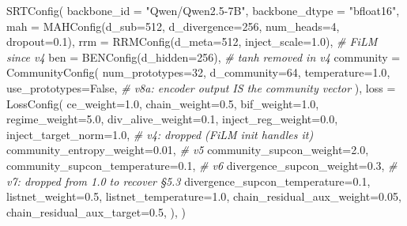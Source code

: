 \documentclass[
  11pt]{article}
\newenvironment{Shaded}{}{}
\newcommand{\CommentTok}[1]{\textcolor[rgb]{0.38,0.63,0.69}{\textit{#1}}}
\newcommand{\DecValTok}[1]{\textcolor[rgb]{0.25,0.63,0.44}{#1}}
\newcommand{\FloatTok}[1]{\textcolor[rgb]{0.25,0.63,0.44}{#1}}
\newcommand{\NormalTok}[1]{#1}
\newcommand{\OperatorTok}[1]{\textcolor[rgb]{0.40,0.40,0.40}{#1}}
\newcommand{\StringTok}[1]{\textcolor[rgb]{0.25,0.44,0.63}{#1}}
\newcommand{\VariableTok}[1]{\textcolor[rgb]{0.10,0.09,0.49}{#1}}
\begin{document}
\begin{Shaded}
\begin{Highlighting}[]
\NormalTok{SRTConfig(}
\NormalTok{    backbone\_id    }\OperatorTok{=} \StringTok{"Qwen/Qwen2.5{-}7B"}\NormalTok{,}
\NormalTok{    backbone\_dtype }\OperatorTok{=} \StringTok{"bfloat16"}\NormalTok{,}
\NormalTok{    mah }\OperatorTok{=}\NormalTok{ MAHConfig(d\_sub}\OperatorTok{=}\DecValTok{512}\NormalTok{, d\_divergence}\OperatorTok{=}\DecValTok{256}\NormalTok{, num\_heads}\OperatorTok{=}\DecValTok{4}\NormalTok{, dropout}\OperatorTok{=}\FloatTok{0.1}\NormalTok{),}
\NormalTok{    rrm }\OperatorTok{=}\NormalTok{ RRMConfig(d\_meta}\OperatorTok{=}\DecValTok{512}\NormalTok{, inject\_scale}\OperatorTok{=}\FloatTok{1.0}\NormalTok{),  }\CommentTok{\# FiLM since v4}
\NormalTok{    ben }\OperatorTok{=}\NormalTok{ BENConfig(d\_hidden}\OperatorTok{=}\DecValTok{256}\NormalTok{),                  }\CommentTok{\# tanh removed in v4}
\NormalTok{    community }\OperatorTok{=}\NormalTok{ CommunityConfig(}
\NormalTok{        num\_prototypes}\OperatorTok{=}\DecValTok{32}\NormalTok{, d\_community}\OperatorTok{=}\DecValTok{64}\NormalTok{, temperature}\OperatorTok{=}\FloatTok{1.0}\NormalTok{,}
\NormalTok{        use\_prototypes}\OperatorTok{=}\VariableTok{False}\NormalTok{,                       }\CommentTok{\# v8a: encoder output IS the community vector}
\NormalTok{    ),}
\NormalTok{    loss }\OperatorTok{=}\NormalTok{ LossConfig(}
\NormalTok{        ce\_weight}\OperatorTok{=}\FloatTok{1.0}\NormalTok{, chain\_weight}\OperatorTok{=}\FloatTok{0.5}\NormalTok{, bif\_weight}\OperatorTok{=}\FloatTok{1.0}\NormalTok{,}
\NormalTok{        regime\_weight}\OperatorTok{=}\FloatTok{5.0}\NormalTok{, div\_alive\_weight}\OperatorTok{=}\FloatTok{0.1}\NormalTok{,}
\NormalTok{        inject\_reg\_weight}\OperatorTok{=}\FloatTok{0.0}\NormalTok{, inject\_target\_norm}\OperatorTok{=}\FloatTok{1.0}\NormalTok{,    }\CommentTok{\# v4: dropped (FiLM init handles it)}
\NormalTok{        community\_entropy\_weight}\OperatorTok{=}\FloatTok{0.01}\NormalTok{,}
        \CommentTok{\# v5}
\NormalTok{        community\_supcon\_weight}\OperatorTok{=}\FloatTok{2.0}\NormalTok{,}
\NormalTok{        community\_supcon\_temperature}\OperatorTok{=}\FloatTok{0.1}\NormalTok{,}
        \CommentTok{\# v6}
\NormalTok{        divergence\_supcon\_weight}\OperatorTok{=}\FloatTok{0.3}\NormalTok{,                     }\CommentTok{\# v7: dropped from 1.0 to recover §5.3}
\NormalTok{        divergence\_supcon\_temperature}\OperatorTok{=}\FloatTok{0.1}\NormalTok{,}
\NormalTok{        listnet\_weight}\OperatorTok{=}\FloatTok{0.5}\NormalTok{,}
\NormalTok{        listnet\_temperature}\OperatorTok{=}\FloatTok{1.0}\NormalTok{,}
\NormalTok{        chain\_residual\_aux\_weight}\OperatorTok{=}\FloatTok{0.05}\NormalTok{,}
\NormalTok{        chain\_residual\_aux\_target}\OperatorTok{=}\FloatTok{0.5}\NormalTok{,}
\NormalTok{    ),}
\NormalTok{)}
\end{Highlighting}
\end{Shaded}
\end{document}
